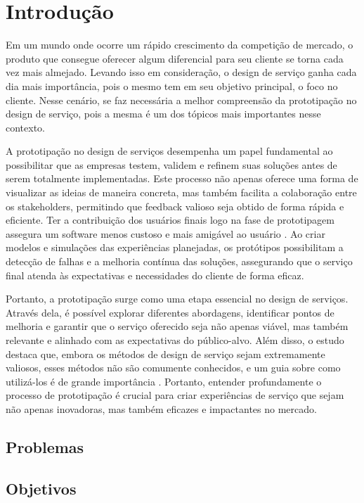\chapter[Introdução]{Introdução}


Em um mundo onde ocorre um rápido crescimento da competição de mercado, o produto que consegue oferecer algum diferencial para seu cliente  se torna cada vez mais almejado. Levando isso em consideração, o design de serviço ganha cada dia mais importância, pois o mesmo tem em seu objetivo principal, o foco no cliente. Nesse cenário, se faz necessária a melhor compreensão da prototipação no design de serviço, pois a mesma é um dos tópicos mais importantes nesse contexto.

A prototipação no design de serviços desempenha um papel fundamental ao possibilitar que as empresas testem, validem e refinem suas soluções antes de serem totalmente implementadas. Este processo não apenas oferece uma forma de visualizar as ideias de maneira concreta, mas também facilita a colaboração entre os stakeholders, permitindo que feedback valioso seja obtido de forma rápida e eficiente. Ter a contribuição dos usuários finais logo na fase de prototipagem assegura um software menos custoso e mais amigável ao usuário \cite{Mattjus2023}. Ao criar modelos e simulações das experiências planejadas, os protótipos possibilitam a detecção de falhas e a melhoria contínua das soluções, assegurando que o serviço final atenda às expectativas e necessidades do cliente de forma eficaz.

Portanto, a prototipação surge como uma etapa essencial no design de serviços. Através dela, é possível explorar diferentes abordagens, identificar pontos de melhoria e garantir que o serviço oferecido seja não apenas viável, mas também relevante e alinhado com as expectativas do público-alvo. Além disso, o estudo destaca que, embora os métodos de design de serviço sejam extremamente valiosos, esses métodos não são comumente conhecidos, e um guia sobre como utilizá-los é de grande importância \cite{Mattjus2023}. Portanto, entender profundamente o processo de prototipação é crucial para criar experiências de serviço que sejam não apenas inovadoras, mas também eficazes e impactantes no mercado.


\section {Problemas}

\section {Objetivos}
